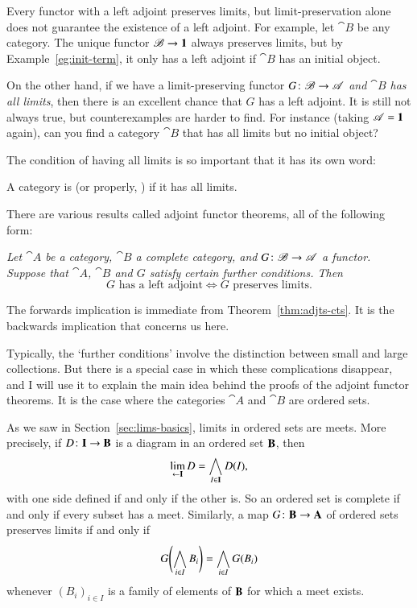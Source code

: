%
%

Every functor with a left adjoint preserves limits, but limit-preservation
alone does not guarantee the existence of a left adjoint.  For example, let
$\cat{B}$ be any category.  The unique functor $\mathscr{B} \to \mathbf{1}$ always
preserves limits, but by Example~\ref{eg:init-term}, it only has a left
adjoint if $\cat{B}$ has an initial object.

On the other hand, if we have a limit-preserving functor $G\from \cat{B}
\to \cat{A}$ \emph{and $\cat{B}$ has all limits}, then there is an
excellent chance that $G$ has a left adjoint.  It is still not always true,
but counterexamples are harder to find.  For instance (taking $\mathscr{A} =
\mathbf{1}$ again), can you find a category $\cat{B}$ that has all limits but no
initial object?

The condition of having all limits is so important that it has its own word:
%
\begin{defn}
\label{defn:complete}
A category is %
%
%
%
(or properly, ) if it has all limits.
\end{defn}

There are various results called adjoint functor theorems, all of the
following form:
%
\begin{displaytext} \it
Let $\cat{A}$ be a category, $\cat{B}$ a complete category, and $G\from \cat{B}
\to \cat{A}$ a functor.  Suppose that $\cat{A}$, $\cat{B}$ and $G$ satisfy
certain further conditions.  Then
\[
G \text{ has a left adjoint}
\iff
G \text{ preserves limits}.
\]
\end{displaytext}
%
The forwards implication is immediate from Theorem~\ref{thm:adjts-cts}.
It is the backwards implication that concerns us here.

Typically, the `further conditions' involve the distinction between small
and large collections.  But there is a special%
%
%
case in which these complications disappear, and I will use it to explain
the main idea behind the proofs of the adjoint functor theorems.  It is the
case where the categories $\cat{A}$ and $\cat{B}$ are ordered sets.

As we saw in Section~\ref{sec:lims-basics}, limits in ordered sets are
meets.  More precisely, if $D\from \scat{I} \to \scat{B}$ is a diagram in
an ordered set $\mathbf{B}$, then
\[
\lim\limits_{\leftarrow \mathbf{I}} D
=
\bigwedge_{I \in \mathbf{I}} D(I),
\]
with one side defined if and only if the other is.  So an ordered set is
complete if and only if every subset has a meet.  Similarly, a map $G\from
\scat{B} \to \scat{A}$ of ordered sets preserves limits if and only if
\[
G\Biggl(\bigwedge_{i \in I} B_i\Biggr)
=
\bigwedge_{i \in I} G(B_i)
\]
whenever $(B_i)_{i \in I}$ is a family of elements of $\mathbf{B}$ for which a
meet exists.


